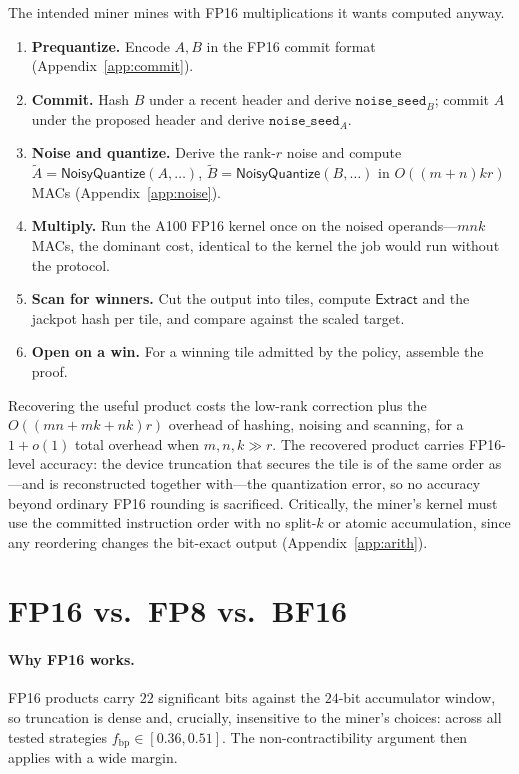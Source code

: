 \documentclass[11pt]{article}
\newcommand{\Extract}{\textsf{Extract}}
\newcommand{\NoisyQuantize}{\textsf{NoisyQuantize}}
\newcommand{\At}{\widetilde{A}}
\newcommand{\Bt}{\widetilde{B}}
\newcommand{\FP}[1]{\textsf{FP#1}}
\begin{document}
The intended miner mines with \FP{16} multiplications it wants computed anyway.
\begin{enumerate}[nosep]
\item \textbf{Prequantize.} Encode $A,B$ in the \FP{16} commit format (Appendix~\ref{app:commit}).
\item \textbf{Commit.} Hash $B$ under a recent header and derive $\texttt{noise\_seed}_B$; commit
      $A$ under the proposed header and derive $\texttt{noise\_seed}_A$.
\item \textbf{Noise and quantize.} Derive the rank-$r$ noise and compute
      $\At=\NoisyQuantize(A,\dots)$, $\Bt=\NoisyQuantize(B,\dots)$ in $O((m+n)kr)$ MACs
      (Appendix~\ref{app:noise}).
\item \textbf{Multiply.} Run the A100 \FP{16} kernel once on the noised operands---$mnk$ MACs, the
      dominant cost, identical to the kernel the job would run without the protocol.
\item \textbf{Scan for winners.} Cut the output into tiles, compute $\Extract$ and the jackpot
      hash per tile, and compare against the scaled target.
\item \textbf{Open on a win.} For a winning tile admitted by the policy, assemble the proof.
\end{enumerate}
Recovering the useful product costs the low-rank correction plus the $O((mn+mk+nk)r)$ overhead of
hashing, noising and scanning, for a $1+o(1)$ total overhead when $m,n,k\gg r$. The recovered
product carries \FP{16}-level accuracy: the device truncation that secures the tile is of the same
order as---and is reconstructed together with---the quantization error, so no accuracy beyond
ordinary \FP{16} rounding is sacrificed. Critically, the miner's kernel must use the committed
instruction order with no split-$k$ or atomic accumulation, since any reordering changes the
bit-exact output (Appendix~\ref{app:arith}).

\section{FP16 vs.\ FP8 vs.\ BF16}\label{sec:compare}

\paragraph{Why \FP{16} works.} \FP{16} products carry $22$ significant bits against the $24$-bit
accumulator window, so truncation is dense and, crucially, insensitive to the miner's choices:
across all tested strategies $f_{\text{bp}}\in[0.36,0.51]$. The non-contractibility argument then
applies with a wide margin.
\end{document}
